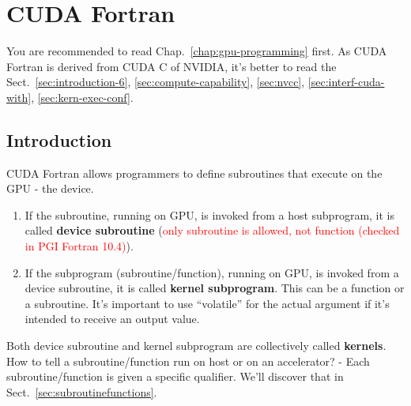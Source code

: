 
\chapter{CUDA Fortran}
\label{chap:cuda-fortran}


You are recommended to read Chap.~\ref{chap:gpu-programming} first. As
CUDA Fortran is derived from CUDA C of NVIDIA, it's better to read the
Sect.~\ref{sec:introduction-6}, \ref{sec:compute-capability},
\ref{sec:nvcc}, \ref{sec:interf-cuda-with}, \ref{sec:kern-exec-conf}.

\section{Introduction}
\label{sec:introduction-4}

CUDA Fortran allows programmers to define subroutines that execute on
the GPU - the device. 
\begin{enumerate}
\item If the subroutine, running on GPU, is invoked from a host
  subprogram, it is called {\bf device subroutine}
  (\textcolor{red}{only subroutine is allowed, not function (checked
    in PGI Fortran 10.4)}).

\item If the subprogram (subroutine/function), running on GPU, is
  invoked from a device subroutine, it is called
  {\bf kernel subprogram}. This can be a function or a subroutine. It's
  important to use ``volatile'' for the actual argument if it's intended to
  receive an output value. 
\end{enumerate}
Both device subroutine and kernel subprogram are collectively called
{\bf kernels}.  How to tell a subroutine/function run on host or on an
accelerator? - Each subroutine/function is given a specific
qualifier. We'll discover that in Sect.~\ref{sec:subroutinefunctions}.

